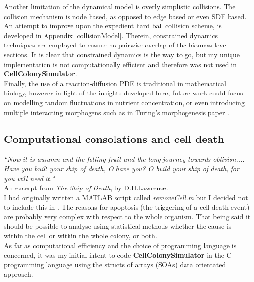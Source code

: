 Another limitation of the dynamical model is overly simplistic collisions.
The collision mechanism is node based, as 
opposed to edge based or even SDF based.
An attempt to improve upon the expedient hard ball collision scheme, 
is developed in Appendix \ref{collisionModel}. Therein,
constrained dynamics techniques are employed to ensure no pairwise
overlap of the biomass level sections. It is clear that constrained
dynamics is the way to go, but my unique implementation is 
not computationally efficient and therefore was not
used in \textbf{CellColonySimulator}.
\\

Finally, the use of a reaction-diffusion PDE is traditional in mathematical biology, however
in light of the insights developed here, future work could focus on modelling 
random fluctuations in nutrient concentration, or even introducing multiple interacting 
morphogens such as in Turing's morphogenesis paper \cite{turing1990chemical}.



\subsection{Computational consolations and cell death}

\textit{``Now it is autumn and the falling fruit
and the long journey towards oblivion....
Have you built your ship of death, O have you?
O build your ship of death, for you will need it."}
\\
An excerpt from \textit{The Ship of Death}, by D.H.Lawrence.
\\

I had originally written a MATLAB script called
\textit{removeCell.m} but I decided not to include this 
in . The reasons 
for apoptosis (the triggering of a cell death event)
are probably very complex with respect to the whole organism.
That being said it should be possible 
to analyse using statistical methods whether 
the cause is within the cell or within the whole 
colony, or both.
\\

As far as computational efficiency and the choice of programming language is concerned, 
it was my initial intent to code \textbf{CellColonySimulator} in the C programming language 
using the structs of arrays (SOAs) data orientated approach. 
\\

